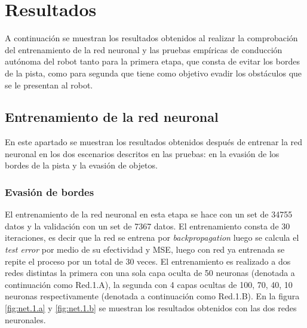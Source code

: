 \documentclass{iccmemoria}
\begin{document}
\chapter{Resultados}

A continuación se muestran los resultados obtenidos al realizar la comprobación del entrenamiento de la red neuronal y las pruebas empíricas de conducción autónoma del robot tanto para la primera etapa, que consta de evitar los bordes de la pista, como para segunda que tiene como objetivo evadir los obstáculos que se le presentan al robot.\\

\section{Entrenamiento de la red neuronal}

En este apartado se muestran los resultados obtenidos después de entrenar la red neuronal en los dos escenarios descritos en las pruebas: en la evasión de los bordes de la pista y la evasión de objetos.\\

\subsection{Evasión de bordes}

El entrenamiento de la red neuronal en esta etapa se hace con un set de 34755 datos y la validación con un set de 7367 datos. El entrenamiento consta de 30 iteraciones, es decir que la red se entrena por \emph{backpropagation} luego se calcula el \emph{test error} por medio de su efectividad y MSE, luego con red ya entrenada se repite el proceso por un total de 30 veces. El entrenamiento es realizado a dos redes distintas la primera con una sola capa oculta de 50 neuronas (denotada a continuación como Red.1.A), la segunda con 4 capas ocultas de 100, 70, 40, 10 neuronas respectivamente (denotada a continuación como Red.1.B). En la figura \ref{fig:net.1.a} y \ref{fig:net.1.b} se muestran los resultados obtenidos con las dos redes neuronales.\\
\end{document}
